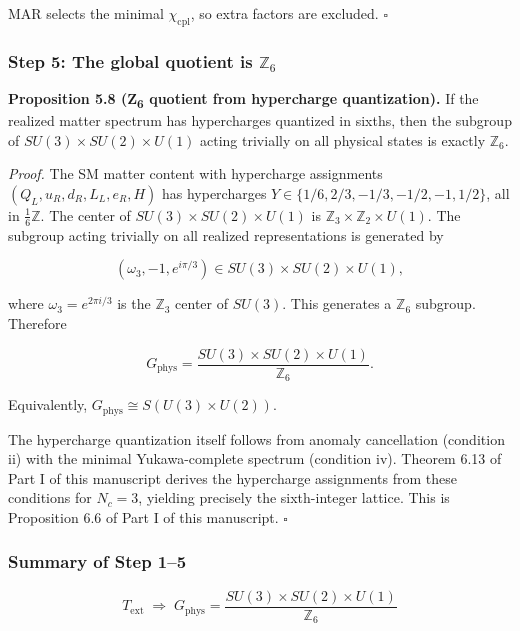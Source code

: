 MAR selects the minimal \(\chi_{\mathrm{cpl}}\), so extra factors are excluded. \(\square\)

\subsubsection{\texorpdfstring{Step 5: The global quotient is \(\mathbb{Z}_6\)}{Step 5: The global quotient is \textbackslash mathbb\{Z\}\_6}}\label{step-5-the-global-quotient-is-mathbbz_6}

\textbf{Proposition 5.8 (Z\textsubscript{6} quotient from hypercharge quantization).} If the realized matter spectrum has hypercharges quantized in sixths, then the subgroup of \(SU(3) \times SU(2) \times U(1)\) acting trivially on all physical states is exactly \(\mathbb{Z}_6\).

\emph{Proof.} The SM matter content with hypercharge assignments \((Q_L, u_R, d_R, L_L, e_R, H)\) has hypercharges \(Y \in \{1/6, 2/3, -1/3, -1/2, -1, 1/2\}\), all in \(\frac{1}{6}\mathbb{Z}\). The center of \(SU(3) \times SU(2) \times U(1)\) is \(\mathbb{Z}_3 \times \mathbb{Z}_2 \times U(1)\). The subgroup acting trivially on all realized representations is generated by

\[(\omega_3, -1, e^{i\pi/3}) \in SU(3) \times SU(2) \times U(1),\]

where \(\omega_3 = e^{2\pi i/3}\) is the \(\mathbb{Z}_3\) center of \(SU(3)\). This generates a \(\mathbb{Z}_6\) subgroup. Therefore

\[G_{\mathrm{phys}} = \frac{SU(3) \times SU(2) \times U(1)}{\mathbb{Z}_6}.\]

Equivalently, \(G_{\mathrm{phys}} \cong S(U(3) \times U(2))\).

The hypercharge quantization itself follows from anomaly cancellation (condition ii) with the minimal Yukawa-complete spectrum (condition iv). Theorem 6.13 of Part I of this manuscript derives the hypercharge assignments from these conditions for \(N_c = 3\), yielding precisely the sixth-integer lattice. This is Proposition 6.6 of Part I of this manuscript. \(\square\)

\subsubsection{Summary of Step 1--5}\label{summary-of-step-15}

\[\boxed{T_{\mathrm{ext}} \;\Longrightarrow\; G_{\mathrm{phys}} = \frac{SU(3) \times SU(2) \times U(1)}{\mathbb{Z}_6}}\]

